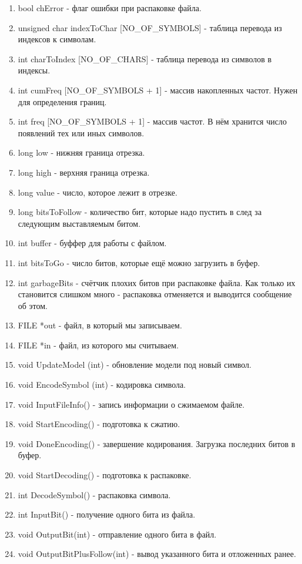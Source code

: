 \documentclass[12pt]{article}
\begin{document}
\begin{enumerate}
	\item bool chError - флаг ошибки при распаковке файла.
	\item unsigned char indexToChar [NO\_OF\_SYMBOLS] - таблица перевода из индексов к символам.
	\item int charToIndex [NO\_OF\_CHARS] - таблица перевода из символов в индексы.
	\item int cumFreq [NO\_OF\_SYMBOLS + 1] - массив накопленных частот. Нужен для определения границ.
	\item int freq [NO\_OF\_SYMBOLS + 1] - массив частот. В нём хранится число появлений тех или иных символов.
	\item long low - нижняя граница отрезка. 
	\item long high - верхняя граница отрезка.
	\item long value - число, которое лежит в отрезке.
	\item long bitsToFollow - количество бит, которые надо пустить в след за следующим выставляемым битом.
	\item int buffer - буффер для работы с файлом.
	\item int bitsToGo - число битов, которые ещё можно загрузить в буфер.
	\item int garbageBits - счётчик плохих битов при распаковке файла. Как только их становится слишком много - распаковка отменяется и выводится сообщение об этом.
	\item FILE *out - файл, в который мы записываем.
	\item FILE *in - файл, из которого мы считываем.
	\item void UpdateModel (int) - обновление модели под новый символ.
	\item void EncodeSymbol (int) - кодировка символа.
	\item void InputFileInfo() - запись информации о сжимаемом файле.
	\item void StartEncoding() - подготовка к сжатию.
	\item void DoneEncoding() - завершение кодирования. Загрузка последних битов в буфер.
	\item void StartDecoding() - подготовка к распаковке.
	\item int DecodeSymbol() - распаковка символа.
	\item int InputBit() - получение одного бита из файла.
	\item void OutputBit(int) - отправление одного бита в файл.
	\item void OutputBitPlusFollow(int) - вывод указанного бита и отложенных ранее.
\end{enumerate}
\end{document}
